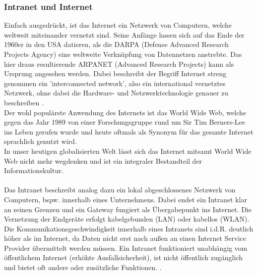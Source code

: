 \subsubsection{Intranet und Internet}\label{sec:intranetundinternet}
Einfach ausgedrückt, ist das Internet ein Netzwerk von Computern, welche weltweit miteinander vernetzt sind. Seine Anfänge lassen sich auf das Ende der 1960er in den USA datieren, als die DARPA (Defense Advanced Research Projects Agency) eine weltweite Verknüpfung von Datennetzen anstrebte. Das hier draus resultierende ARPANET (Advanced Research Projects) kann als Ursprung angesehen werden. Dabei beschreibt der Begriff Internet streng genommen ein 'interconnected network', also ein international vernetztes Netzwerk, ohne dabei die Hardware- und Netzwerktechnologie genauer zu beschreiben \cite{Safran2011}.  \\ 
Der wohl populärste Anwendung des Internets ist das World Wide Web, welche gegen das Jahr 1989 von einer Forschungsgruppe rund um Sir Tim Berners-Lee ins Leben gerufen wurde und heute oftmals als Synonym für das gesamte Internet sprachlich genutzt wird. \\ 

In unser heutigen globalisierten Welt lässt sich das Internet mitsamt World Wide Web nicht mehr wegdenken und ist ein integraler Bestandteil der Informationskultur. 
 \\ \\
 Das Intranet beschreibt analog dazu ein lokal abgeschlossenes Netzwerk von Computern, bspw. innerhalb eines Unternehmens. Dabei endet ein Intranet klar an seinen Grenzen und ein Gateway fungiert als Übergabepunkt ins Internet. Die Vernetzung der Endgeräte erfolgt kabelgebunden (LAN) oder kabellos (WLAN). Die Kommunikationsgeschwindigkeit innerhalb eines Intranets sind i.d.R. deutlich höher als im Internet, da Daten nicht erst nach außen an einen Internet Service Provider übermittelt werden müssen. Ein Intranet funktioniert unabhängig vom öffentlichem Internet (erhöhte Ausfallsicherheit), ist nicht öffentlich zugänglich und bietet oft andere oder zusätzliche Funktionen. \cite{Intranet62:online}. 
 
